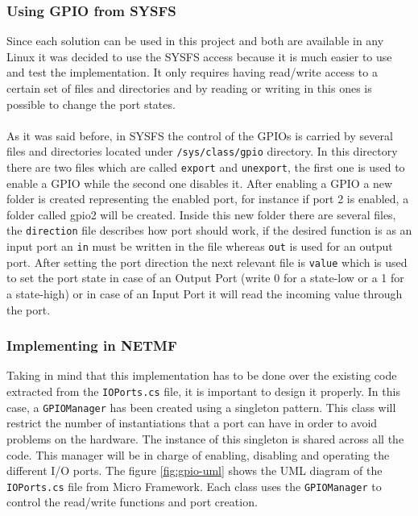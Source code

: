 \subsubsection{Using GPIO from SYSFS}\label{SSS:IOSharp-GPIO-SYSFS}
Since each solution can be used in this project and both are available in any Linux it was decided to use the SYSFS access because it is much easier to use and test the implementation. It only requires having read/write access to a certain set of files and directories and by reading or writing in this ones is possible to change the port states.
\\
\\
As it was said before, in SYSFS the control of the GPIOs is carried by several files and directories located under \verb!/sys/class/gpio! directory. In this directory there are two files which are called \verb!export! and \verb!unexport!, the first one is used to enable a GPIO while the second one disables it. After enabling a GPIO a new folder is created representing the enabled port, for instance if port 2 is enabled, a folder called gpio2 will be created. Inside this new folder there are several files, the \verb!direction! file describes how port should work, if the desired function is as an input port an \verb!in! must be written in the file whereas \verb!out! is used for an output port. After setting the port direction the next relevant file is \verb!value! which is used to set the port state in case of an Output Port (write 0 for a state-low or a 1 for a state-high) or in case of an Input Port it will read the incoming value through the port.

\subsubsection{Implementing in NETMF}\label{SSS:Implementing-GPIO-NETMF}
Taking in mind that this implementation has to be done over the existing code extracted from the \verb!IOPorts.cs! file, it is important to design it properly. In this case, a \verb!GPIOManager! has been created using a singleton pattern. This class will restrict the number of instantiations that a port can have in order to avoid problems on the hardware. The instance of this singleton is shared across all the code. This manager will be in charge of enabling, disabling and operating the different I/O ports. The figure \ref{fig:gpio-uml} shows the UML diagram of the \verb!IOPorts.cs! file from Micro Framework. Each class uses the \verb!GPIOManager! to control the read/write functions and port creation.

